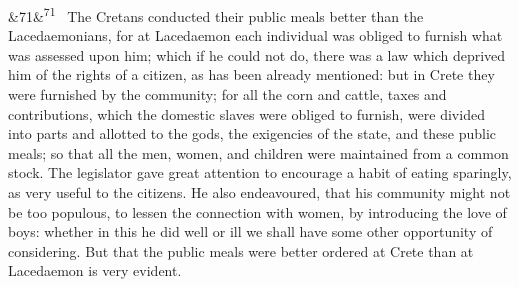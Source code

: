 \documentclass[12pt]{article}
\newcommand{\para}[1][]{\par\noindent\ifx&#1&\else\textsuperscript{\footnotesize #1}~\fi}
\begin{document}
\para[71] The Cretans conducted their public meals better than the Lacedaemonians, for at Lacedaemon each individual was obliged to furnish what was assessed upon him; which if he could not do, there was a law which deprived him of the rights of a citizen, as has been already mentioned: but in Crete they were furnished by the community; for all the corn and cattle, taxes and contributions, which the domestic slaves were obliged to furnish, were divided into parts and allotted to the gods, the exigencies of the state, and these public meals; so that all the men, women, and children were maintained from a common stock. The legislator gave great attention to encourage a habit of eating sparingly, as very useful to the citizens. He also endeavoured, that his community might not be too populous, to lessen the connection with women, by introducing the love of boys: whether in this he did well or ill we shall have some other opportunity of considering. But that the public meals were better ordered at Crete than at Lacedaemon is very evident.
\end{document}
